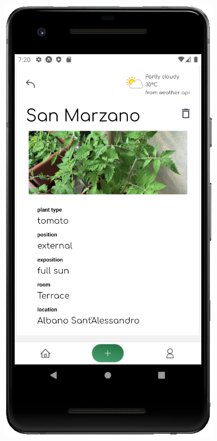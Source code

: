 \documentclass[10pt]{article}
\begin{document}
    \clearpage
    \begin{figure}[h]
     \centering
     \begin{minipage}[h]{0.4\textwidth}
         \centering
         \includegraphics[width=\textwidth]{resources/screens/Details1.PNG}

\end{minipage}
\end{figure}
\end{document}
